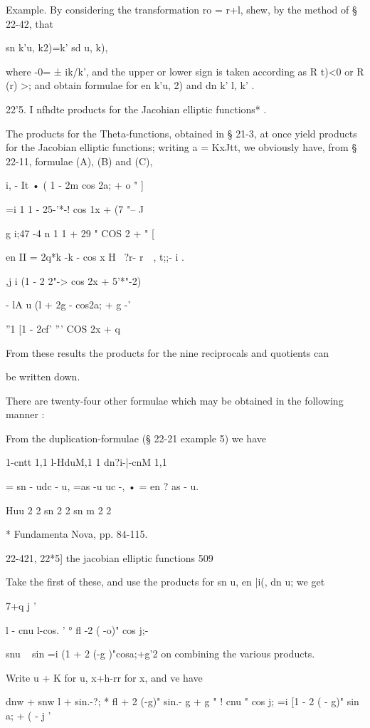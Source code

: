 Example. By considering the transformation ro = r+l, shew, by the
method of § 22-42, that

sn k'u, k2)=k' sd u, k),

where -0= ± ik/k', and the upper or lower sign is taken according as R
t)<0 or R (r) >; and obtain formulae for en k'u, 2) and dn k' l, k' .

22'5. I nfhdte products for the Jacohian elliptic functions* .

The products for the Theta-functions, obtained in § 21-3, at once
yield products for the Jacobian elliptic functions; writing a =
KxJtt, we obviously have, from § 22-11, formulae (A), (B) and (C),

  i, - It • ( 1 - 2m cos 2a; + o " ]

   =i 1 1 - 25-'*-! cos 1x + (7 "-- J

g i;47 -4 n 1 1 + 29 " COS 2 + " [

en II = 2q*k -k - cos x H \ ?r- r~~, t;;- i .

,j i (1 - 2 2"-> cos 2x + 5'*"-2)

- lA u (l + 2g - cos2a; + g -'

''1 [1 - 2cf' ''' COS 2x + q

From these results the products for the nine reciprocals and quotients
can

be written down.

There are twenty-four other formulae which may be obtained in the
following manner :

From the duplication-formulae (§ 22-21 example 5) we have

1-cntt 1,1 l-HduM,1 1 dn?i-|-cnM 1,1

= sn - udc - u, =as -u uc -, • = en ? as - u.

Huu 2 2 sn 2 2 sn m 2 2

* Fundamenta Nova, pp. 84-115.

22-421, 22*5] the jacobian elliptic functions 509

Take the first of these, and use the products for sn u, en |i(, dn u;
we get

7+q j '

l - cnu l-cos. ' ° fl -2 ( -o)" cos j;-

snu ~ sin =i (1 + 2 (-g )"cosa;+g'2 on combining the various products.

Write u + K for u, x+h-rr for x, and ve have

dnw + snw l + sin.-?; * fl + 2 (-g)" sin.- g + g " ! cnu " cos j; =i
[1 - 2 ( - g)" sin a; + ( - j '

